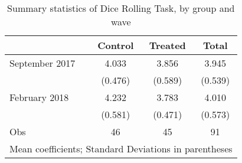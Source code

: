 \begin{table}
\caption{Summary statistics of Dice Rolling Task, by group and wave}
\centering
\begin{tabular}{l*{3}{c}} \toprule
            &     Control&     Treated&       Total\\
\midrule
September 2017  &       4.033&       3.856&       3.945\\
            &     (0.476)&     (0.589)&     (0.539)\\
February 2018       &       4.232&       3.783&       4.010\\
            &     (0.581)&     (0.471)&     (0.573)\\
\midrule
Obs       &          46&         45   &          91  \\
\bottomrule
\multicolumn{4}{l}{\footnotesize Mean coefficients; Standard Deviations in parentheses}\\
\end{tabular}
\label{tab:sum_dice}
\end{table}